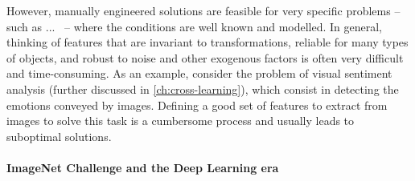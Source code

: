 However, manually engineered solutions are feasible for very specific problems -- such as ...~\cite{} -- where the conditions are well known and modelled.
In general, thinking of features that are invariant to transformations, reliable for many types of objects, and robust to noise and other exogenous factors is often very difficult and time-consuming.
As an example, consider the problem of visual sentiment analysis (further discussed in \ref{ch:cross-learning}), which consist in detecting the emotions conveyed by images.
Defining a good set of features to extract from images to solve this task is a cumbersome process and usually leads to suboptimal solutions.

\paragraph{ImageNet Challenge and the Deep Learning era}

